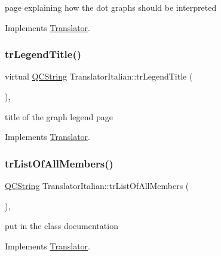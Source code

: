 page explaining how the dot graph\textquotesingle{}s should be interpreted 

Implements \mbox{\hyperlink{class_translator}{Translator}}.

\mbox{\label{class_translator_italian_a67cd869f445d313c0c00e8780c48bf82}} 
\subsubsection{\texorpdfstring{trLegendTitle()}{trLegendTitle()}}
{\footnotesize\ttfamily virtual \mbox{\hyperlink{class_q_c_string}{Q\+C\+String}} Translator\+Italian\+::tr\+Legend\+Title (\begin{DoxyParamCaption}{ }\end{DoxyParamCaption})\hspace{0.3cm}{\ttfamily [inline]}, {\ttfamily [virtual]}}

title of the graph legend page 

Implements \mbox{\hyperlink{class_translator}{Translator}}.

\mbox{\label{class_translator_italian_a94c13af529cf8a66183315fbaf35858d}} 
\subsubsection{\texorpdfstring{trListOfAllMembers()}{trListOfAllMembers()}}
{\footnotesize\ttfamily \mbox{\hyperlink{class_q_c_string}{Q\+C\+String}} Translator\+Italian\+::tr\+List\+Of\+All\+Members (\begin{DoxyParamCaption}{ }\end{DoxyParamCaption})\hspace{0.3cm}{\ttfamily [inline]}, {\ttfamily [virtual]}}

put in the class documentation 

Implements \mbox{\hyperlink{class_translator}{Translator}}.

\mbox{\label{class_translator_italian_a069fabe48f5ed739388c56794d1fcfda}} 
